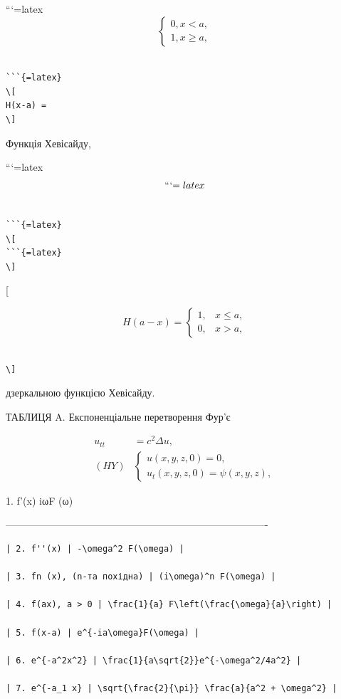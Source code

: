 \documentclass[
  ukrainian,
]{article}
\begin{document}
```{=latex}
\[
\begin{cases} 0, x < a, \\ 1, x \geqslant a, \end{cases}
\]

\begin{verbatim}

```{=latex}
\[
H(x-a) =
\]
\end{verbatim}

Функція Хевісайду,

```{=latex}
\[
```{=latex}
\]

\begin{verbatim}

```{=latex}
\[
```{=latex}
\]
\end{verbatim}

{[}

\[
H(a-x) = \begin{cases} 1, & x \leqslant a, \\ 0, & x > a, \end{cases}
\]

\begin{verbatim}

\]
\end{verbatim}

дзеркальною функцією Хевісайду.

ТАБЛИЦЯ A. Експоненціальне перетворення Фур'є

\[
\begin{aligned} u_{tt} &= c^2 \Delta u, \\ (HY) & \begin{cases} u(x, y, z, 0) = 0, \\ u_t(x, y, z, 0) = \psi(x, y, z), \end{cases} \end{aligned}
\]

1. f'(x) \textbar{} iωF (ω) \textbar{}

\textbar------------------------------\textbar-------------------------------------------------\textbar{}

\begin{verbatim}
| 2. f''(x) | -\omega^2 F(\omega) |

| 3. fn (x), (n-та похідна) | (i\omega)^n F(\omega) |

| 4. f(ax), a > 0 | \frac{1}{a} F\left(\frac{\omega}{a}\right) |

| 5. f(x-a) | e^{-ia\omega}F(\omega) |

| 6. e^{-a^2x^2} | \frac{1}{a\sqrt{2}}e^{-\omega^2/4a^2} |

| 7. e^{-a_1 x} | \sqrt{\frac{2}{\pi}} \frac{a}{a^2 + \omega^2} |
\end{verbatim}
\end{document}
